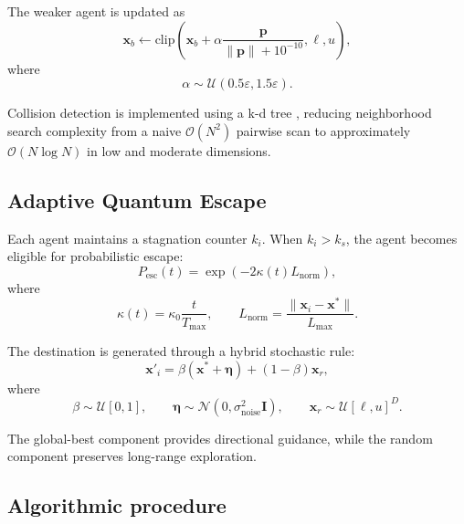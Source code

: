 \documentclass[final,5p,times,twocolumn]{elsarticle}
\begin{document}
The weaker agent is updated as
\begin{equation}
\mathbf{x}_b
\leftarrow
\mathrm{clip}
\left(
\mathbf{x}_b+
\alpha\frac{\mathbf{p}}{\|\mathbf{p}\|+10^{-10}},
\ell,u
\right),
\end{equation}
where
\begin{equation}
\alpha\sim\mathcal{U}(0.5\varepsilon,1.5\varepsilon).
\end{equation}

Collision detection is implemented using a k-d tree
\cite{bentley1975multidimensional}, reducing neighborhood
search complexity from a naive $\mathcal{O}(N^2)$ pairwise
scan to approximately $\mathcal{O}(N\log N)$ in low and
moderate dimensions.

\subsection{Adaptive Quantum Escape}

Each agent maintains a stagnation counter $k_i$.
When $k_i>k_s$, the agent becomes eligible for probabilistic
escape:
\begin{equation}
P_{\mathrm{esc}}(t)
=
\exp\left(-2\kappa(t)L_{\mathrm{norm}}\right),
\end{equation}
where
\begin{equation}
\kappa(t)=\kappa_0\frac{t}{T_{\max}},
\qquad
L_{\mathrm{norm}}
=
\frac{\|\mathbf{x}_i-\mathbf{x}^{*}\|}{L_{\max}}.
\end{equation}

The destination is generated through a hybrid stochastic rule:
\begin{equation}
\mathbf{x}'_i
=
\beta(\mathbf{x}^{*}+\boldsymbol{\eta})
+
(1-\beta)\mathbf{x}_r,
\end{equation}
where
\[
\beta\sim\mathcal{U}[0,1],
\qquad
\boldsymbol{\eta}\sim\mathcal{N}(0,\sigma_{\mathrm{noise}}^2\mathbf{I}),
\qquad
\mathbf{x}_r\sim\mathcal{U}[\ell,u]^D.
\]

The global-best component provides directional guidance, while
the random component preserves long-range exploration.



\subsection{Algorithmic procedure}
\end{document}

